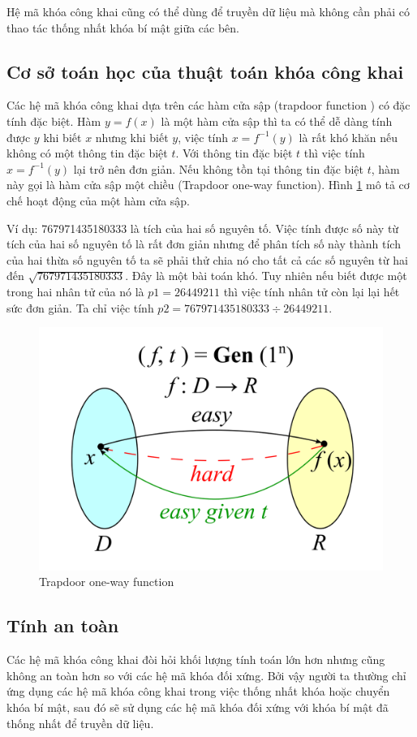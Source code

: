 \documentclass[a4paper,12pt]{report}
\begin{document}
Hệ mã khóa công khai cũng có thể dùng để truyền dữ liệu mà không cần phải có thao tác thống nhất khóa bí mật giữa các bên.

\subsection*{Cơ sở toán học của thuật toán khóa công khai}
Các hệ mã khóa công khai dựa trên các hàm cửa sập (trapdoor function ) có đặc tính đặc biệt. Hàm $y = f(x)$ là một hàm cửa sập thì ta có thể dễ dàng tính được $y$ khi biết $x$ nhưng khi biết $y$, việc tính $x = f^{-1}(y)$ là rất khó khăn nếu không có một thông tin đặc biệt $t$. Với thông tin đặc biệt $t$ thì việc tính $x = f^{-1}(y)$ lại trở nên đơn giản. Nếu không tồn tại thông tin đặc biệt $t$, hàm này gọi là hàm cửa sập một chiều (Trapdoor one-way function). Hình \ref{trap1} mô tả cơ chế hoạt động của một hàm cửa sập.

Ví dụ: 767971435180333 là tích của hai số nguyên tố. Việc tính được số này từ tích của hai số nguyên tố là rất đơn giản nhưng để phân tích số này thành tích của hai thừa số nguyên tố ta sẽ phải thử chia nó cho tất cả các số nguyên từ hai đến $\sqrt{767971435180333}$. Đây là một bài toán khó. Tuy nhiên nếu biết được một trong hai nhân tử của nó là $p1 = 26449211$ thì việc tính nhân tử còn lại lại hết sức đơn giản. Ta chỉ việc tính $p2 = 767971435180333 \div 26449211$.

\begin{center}
\begin{figure}[H]
\centering 
\includegraphics[width=0.6\linewidth]{../trap.png}
\caption{Trapdoor one-way function} \label{trap1}
\end{figure}
\end{center}
\subsection*{Tính an toàn}
Các hệ mã khóa công khai đòi hỏi khối lượng tính toán lớn hơn nhưng cũng không an toàn hơn so với các hệ mã khóa đối xứng. Bởi vậy người ta thường chỉ ứng dụng các hệ mã khóa công khai trong việc thống nhất khóa hoặc chuyển khóa bí mật, sau đó sẽ sử dụng các hệ mã khóa đối xứng với khóa bí mật đã thống nhất để truyền dữ liệu.
\end{document}
